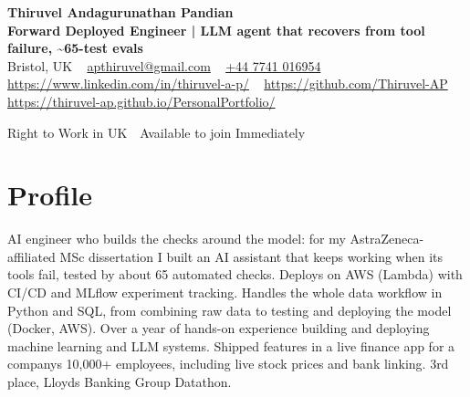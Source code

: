\documentclass[a4paper,11pt]{article}
\begin{document}
\begin{center}
  {\LARGE\bfseries Thiruvel Andagurunathan Pandian} \\[3pt]
  {\color{headernavy}\small\textbf{Forward Deployed Engineer | LLM agent that recovers from tool failure, \textasciitilde{}65-test evals}} \\[3pt]
  {\small
  Bristol, UK\nobreak\ \,\textbar\, \href{mailto:apthiruvel@gmail.com}{apthiruvel@gmail.com}\nobreak\ \,\textbar\, \href{tel:+447741016954}{+44 7741 016954}\nobreak\ \,\textbar\, \href{https://www.linkedin.com/in/thiruvel-a-p/}{https://www.linkedin.com/in/thiruvel-a-p/}\nobreak\ \,\textbar\, \href{https://github.com/Thiruvel-AP}{https://github.com/Thiruvel-AP}\nobreak\ \,\textbar\, \href{https://thiruvel-ap.github.io/PersonalPortfolio/}{https://thiruvel-ap.github.io/PersonalPortfolio/}}\par\vspace{4pt}
  \noindent{} Right to Work in UK \,\textbar\, Available to join Immediately
\end{center}

\section{Profile}
AI engineer who builds the checks around the model: for my AstraZeneca-affiliated MSc dissertation I built an AI assistant that keeps working when its tools fail, tested by about 65 automated checks. Deploys on AWS (Lambda) with CI/CD and MLflow experiment tracking. Handles the whole data workflow in Python and SQL, from combining raw data to testing and deploying the model (Docker, AWS). Over a year of hands-on experience building and deploying machine learning and LLM systems. Shipped features in a live finance app for a company\textquotesingle{}s 10,000+ employees, including live stock prices and bank linking. 3rd place, Lloyd\textquotesingle{}s Banking Group Datathon.
\end{document}
